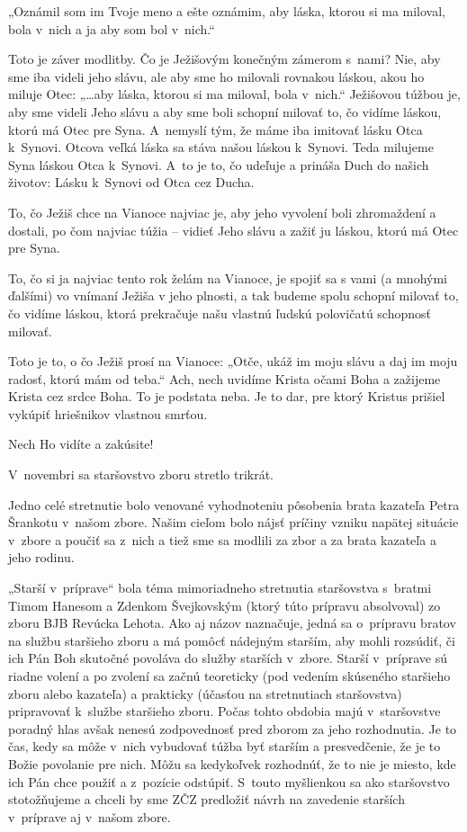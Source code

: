 „Oznámil som im Tvoje meno a ešte oznámim, aby láska, ktorou si ma miloval, bola v~nich a ja aby som bol v~nich.“

Toto je záver modlitby. Čo je Ježišovým konečným zámerom s~nami? Nie, aby sme iba videli jeho slávu, ale aby sme ho milovali rovnakou láskou, akou ho miluje Otec:
„…aby láska, ktorou si ma miloval, bola v~nich.“ Ježišovou túžbou je, aby sme videli Jeho slávu a aby sme boli schopní milovať to, čo vidíme láskou, ktorú má Otec pre Syna. A~nemyslí tým, že máme iba imitovať lásku Otca k~Synovi. Otcova veľká láska sa stáva našou láskou k~Synovi. Teda milujeme Syna láskou Otca k~Synovi. A~to je to, čo udeľuje a prináša Duch do našich životov: Lásku k~Synovi od Otca cez Ducha.

To, čo Ježiš chce na Vianoce najviac je, aby jeho vyvolení boli zhromaždení a dostali, po čom najviac túžia -- vidieť Jeho slávu a zažiť ju láskou, ktorú má Otec pre Syna.

To, čo si ja najviac tento rok želám na Vianoce, je spojiť sa s vami (a mnohými ďalšími) vo vnímaní Ježiša v jeho plnosti, a tak budeme spolu schopní milovať to, čo vidíme láskou, ktorá prekračuje našu vlastnú ľudskú polovičatú schopnosť milovať.

Toto je to, o čo Ježiš prosí na Vianoce: „Otče, ukáž im moju slávu a daj im moju radosť, ktorú mám od teba.“ Ach, nech uvidíme Krista očami Boha a zažijeme Krista cez srdce Boha. To je podstata neba. Je to dar, pre ktorý Kristus prišiel vykúpiť hriešnikov vlastnou smrťou.

Nech Ho vidíte a zakúsite!



V~novembri sa staršovstvo zboru stretlo trikrát.

Jedno celé stretnutie bolo venované vyhodnoteniu pôsobenia brata kazateľa Petra Šrankotu v~našom zbore. Našim cieľom bolo nájsť príčiny vzniku napätej situácie v~zbore a poučiť sa z~nich a tiež sme sa modlili za zbor a za brata kazateľa a jeho rodinu.

„Starší v~príprave“ bola téma mimoriadneho stretnutia staršovstva s~bratmi Timom Hanesom a Zdenkom Švejkovským (ktorý túto prípravu absolvoval) zo zboru BJB Revúcka Lehota. Ako aj názov naznačuje, jedná sa o~prípravu bratov na službu staršieho zboru a má pomôcť nádejným starším, aby mohli rozsúdiť, či ich Pán Boh skutočné povoláva do služby starších v~zbore. Starší v~príprave sú riadne volení a po zvolení sa začnú teoreticky (pod vedením skúseného staršieho zboru alebo kazateľa) a prakticky (účasťou na stretnutiach staršovstva) pripravovať k~službe staršieho zboru. Počas tohto obdobia majú v~staršovstve poradný hlas avšak nenesú zodpovednosť pred zborom za jeho rozhodnutia. Je to čas, kedy sa môže v~nich vybudovať túžba byť starším a presvedčenie, že je to Božie povolanie pre nich. Môžu sa kedykoľvek rozhodnúť, že to nie je miesto, kde ich Pán chce použiť a z~pozície odstúpiť. S~touto myšlienkou sa ako staršovstvo stotožňujeme a chceli by sme ZČZ predložiť návrh na zavedenie starších v~príprave aj v~našom zbore.

